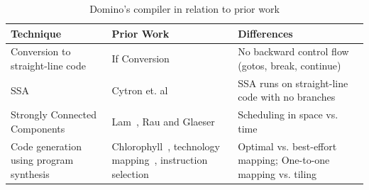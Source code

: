 \begin{table}[!t]
  \begin{scriptsize}
    \begin{tabular}{|p{}|p{}|p{}|}
  \hline
  Technique & Prior Work & Differences \\
  \hline
  Conversion to straight-line code & If Conversion~\cite{if_conversion} & No backward control flow (gotos, break, continue) \\
  \hline
  SSA & Cytron et. al~\cite{ssa} & SSA runs on straight-line code with no branches \\
  \hline
  Strongly Connected Components & Lam~\cite{software_pipelining}, Rau and Glaeser~\cite{rau} & Scheduling in space vs. time \\
  \hline
  Code generation using program synthesis & Chlorophyll~\cite{chlorophyll}, technology mapping~\cite{micheli, flowmap, spectransform}, instruction selection~\cite{muchnik} & Optimal vs. best-effort mapping; One-to-one mapping vs. tiling \\
  \hline
  \end{tabular}
  \end{scriptsize}
  \caption{Domino's compiler in relation to prior work}
  \label{tab:prior_compiler}
\end{table}
